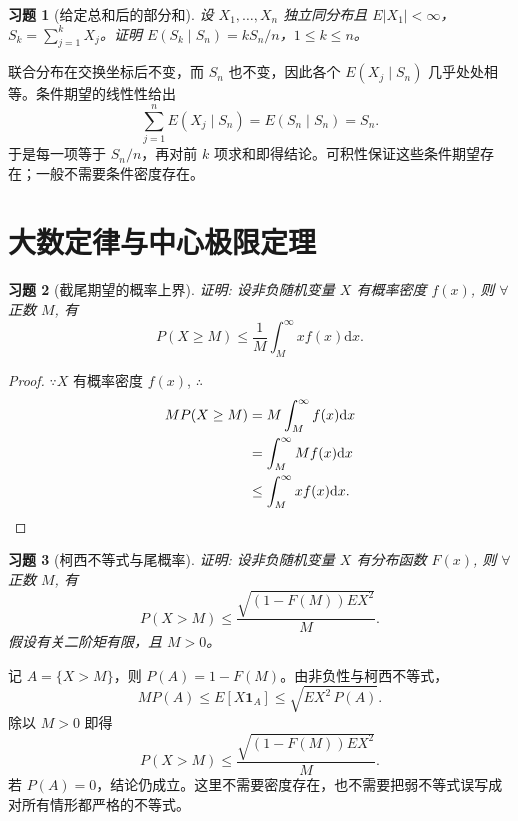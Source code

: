 \documentclass[12pt,fontset=fandol]{ctexart}
\newtheorem{exercise}{习题}[section]
\begin{document}
\begin{exercise}[给定总和后的部分和]\label{q:A6.35}
设 $X_1,\ldots,X_n$ 独立同分布且 $E|X_1|<\infty$，$S_k=\sum_{j=1}^kX_j$。证明 $E(S_k\mid S_n)=kS_n/n$，$1\le k\le n$。\par{}
\end{exercise}

\begin{solve}\label{a:A6.35}联合分布在交换坐标后不变，而 $S_n$ 也不变，因此各个 $E(X_j\mid S_n)$ 几乎处处相等。条件期望的线性性给出\[\sum_{j=1}^nE(X_j\mid S_n)=E(S_n\mid S_n)=S_n.\]于是每一项等于 $S_n/n$，再对前 $k$ 项求和即得结论。可积性保证这些条件期望存在；一般不需要条件密度存在。\end{solve}

\clearpage\section{大数定律与中心极限定理}

\begin{exercise}[截尾期望的概率上界]\label{q:A7.2}
证明: 设非负随机变量 $X$ 有概率密度 $f(x)$, 则 $\forall$ 正数 $M$, 有
    \[P(X\geq M)\leq\dfrac{1}{M}\int_M^\infty xf(x)\mathrm{d}x.\]\par{}
\end{exercise}

\begin{proof}\label{a:A7.2}
    $\because X$ 有概率密度 $f(x)$, $\therefore$
    \begin{align*}
        MP(X\geq M) & =M\int_M^\infty f(x)\mathrm{d}x \\
        & =\int_M^\infty Mf(x)\mathrm{d}x \\
        & \leq\int_M^\infty xf(x)\mathrm{d}x.\qedhere
    \end{align*}
\end{proof}

\begin{exercise}[柯西不等式与尾概率]\label{q:A7.3}
证明: 设非负随机变量 $X$ 有分布函数 $F(x)$, 则 $\forall$ 正数 $M$, 有
    \[P(X>M)\leq\dfrac{\sqrt{(1-F(M))EX^2}}{M}.\] 假设有关二阶矩有限，且 $M>0$。\par{}
\end{exercise}

\begin{solve}\label{a:A7.3}记 $A=\{X>M\}$，则 $P(A)=1-F(M)$。由非负性与柯西不等式，\[MP(A)\le E[X\mathbf1_A]\le\sqrt{EX^2\,P(A)}.\]除以 $M>0$ 即得\[P(X>M)\le\frac{\sqrt{(1-F(M))EX^2}}M.\]若 $P(A)=0$，结论仍成立。这里不需要密度存在，也不需要把弱不等式误写成对所有情形都严格的不等式。\end{solve}
\end{document}
